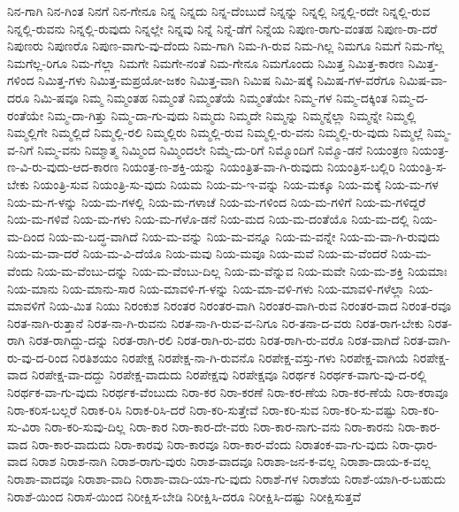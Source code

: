 {ನಿನ-ಗಾಗಿ
ನಿನ-ಗಿಂತ
ನಿನಗೆ
ನಿನ-ಗೇನೂ
ನಿನ್ನ
ನಿನ್ನದು
ನಿನ್ನ-ದೆಂಬುದೆ
ನಿನ್ನನ್ನು
ನಿನ್ನಲ್ಲಿ
ನಿನ್ನಲ್ಲಿ-ರದೇ
ನಿನ್ನಲ್ಲಿ-ರುವ
ನಿನ್ನಲ್ಲಿ-ರುವನು
ನಿನ್ನಲ್ಲಿ-ರುವುದು
ನಿನ್ನಲ್ಲೇ
ನಿನ್ನವು
ನಿನ್ನೆ
ನಿನ್ನೆ-ಡೆಗೆ
ನಿನ್ನೆಯ
ನಿಪುಣ-ರಾಗು-ವಂತಹ
ನಿಪುಣ-ರಾ-ದರೆ
ನಿಪುಣರು
ನಿಪುಣರೊ
ನಿಪುಣ-ವಾಗು-ವು-ದೆಂದು
ನಿಮ-ಗಾಗಿ
ನಿಮ-ಗಿ-ರುವ
ನಿಮ-ಗಿಲ್ಲ
ನಿಮಗೂ
ನಿಮಗೆ
ನಿಮ-ಗೆಲ್ಲ
ನಿಮಗೆಲ್ಲ-ರಿಗೂ
ನಿಮ-ಗೆಲ್ಲಾ
ನಿಮಗೇ
ನಿಮಗೇ-ನಂತೆ
ನಿಮ-ಗೇನೂ
ನಿಮಗೊಂದು
ನಿಮಿತ್ತ
ನಿಮಿತ್ತ-ಕಾರಣ
ನಿಮಿತ್ತ-ಗಳಿಂದ
ನಿಮಿತ್ತ-ಗಳು
ನಿಮಿತ್ತ-ಮಪ್ರಯೋ-ಜಕಂ
ನಿಮಿತ್ತ-ವಾಗಿ
ನಿಮಿಷ
ನಿಮಿ-ಷಕ್ಕೆ
ನಿಮಿಷ-ಗಳ-ವರೆಗೂ
ನಿಮಿಷ-ವಾ-ದರೂ
ನಿಮಿ-ಷವೂ
ನಿಮ್ಮ
ನಿಮ್ಮಂತಹ
ನಿಮ್ಮಂತೆ
ನಿಮ್ಮಂತೆಯೆ
ನಿಮ್ಮಂತೆಯೇ
ನಿಮ್ಮ-ಗಳ
ನಿಮ್ಮ-ದಕ್ಕಿಂತ
ನಿಮ್ಮ-ದ-ರಂತೆಯೇ
ನಿಮ್ಮ-ದಾ-ಗಿತ್ತು
ನಿಮ್ಮ-ದಾ-ಗು-ವುದು
ನಿಮ್ಮದು
ನಿಮ್ಮದೇ
ನಿಮ್ಮನ್ನು
ನಿಮ್ಮನ್ನೆಲ್ಲಾ
ನಿಮ್ಮನ್ನೇ
ನಿಮ್ಮಲ್ಲಿ
ನಿಮ್ಮಲ್ಲಿಗೇ
ನಿಮ್ಮಲ್ಲಿದೆ
ನಿಮ್ಮಲ್ಲಿ-ರಲಿ
ನಿಮ್ಮಲ್ಲಿರು
ನಿಮ್ಮಲ್ಲಿ-ರುವ
ನಿಮ್ಮಲ್ಲಿ-ರು-ವನು
ನಿಮ್ಮಲ್ಲಿ-ರು-ವುದು
ನಿಮ್ಮಲ್ಲೆ
ನಿಮ್ಮ-ವ-ನಿಗೆ
ನಿಮ್ಮ-ವನು
ನಿಮ್ಮಾತ್ಮ
ನಿಮ್ಮಿಂದ
ನಿಮ್ಮಿಂದಲೇ
ನಿಮ್ಮೆ-ದು-ರಿಗೆ
ನಿಮ್ಮೊಂದಿಗೆ
ನಿಮ್ಮೊ-ಡನೆ
ನಿಯಂತ್ರಣ
ನಿಯಂತ್ರ-ಣ-ವಿ-ರು-ವುದು-ಆದ-ಕಾರಣ
ನಿಯಂತ್ರ-ಣ-ಶಕ್ತಿ-ಯನ್ನು
ನಿಯಂತ್ರಿತ-ವಾ-ಗಿ-ರುವುದು
ನಿಯಂತ್ರಿಸ-ಬಲ್ಲಿರಿ
ನಿಯಂತ್ರಿ-ಸ-ಬೇಕು
ನಿಯಂತ್ರಿ-ಸುವ
ನಿಯಂತ್ರಿ-ಸು-ವುದು
ನಿಯಮ
ನಿಯ-ಮ-ಇ-ವನ್ನು
ನಿಯ-ಮಕ್ಕೂ
ನಿಯ-ಮಕ್ಕೆ
ನಿಯ-ಮ-ಗಳ
ನಿಯ-ಮ-ಗ-ಳನ್ನು
ನಿಯ-ಮ-ಗಳಲ್ಲಿ
ನಿಯ-ಮ-ಗಳಾಚೆ
ನಿಯ-ಮ-ಗಳಿಂದ
ನಿಯ-ಮ-ಗಳಿಗೆ
ನಿಯ-ಮ-ಗಳಿದ್ದರೆ
ನಿಯ-ಮ-ಗಳಿವೆ
ನಿಯ-ಮ-ಗಳು
ನಿಯ-ಮ-ಗಳೊ-ಡನೆ
ನಿಯ-ಮದ
ನಿಯ-ಮ-ದಂತೆಯೊ
ನಿಯ-ಮ-ದಲ್ಲಿ
ನಿಯ-ಮ-ದಿಂದ
ನಿಯ-ಮ-ಬದ್ಧ-ವಾಗಿದೆ
ನಿಯ-ಮ-ವನ್ನು
ನಿಯ-ಮ-ವನ್ನೂ
ನಿಯ-ಮ-ವನ್ನೇ
ನಿಯ-ಮ-ವಾ-ಗಿ-ರುವುದು
ನಿಯ-ಮ-ವಾ-ದರೆ
ನಿಯ-ಮ-ವಿ-ದೆಯೊ
ನಿಯ-ಮವು
ನಿಯ-ಮವೂ
ನಿಯ-ಮವೆ
ನಿಯ-ಮ-ವೆಂದರೆ
ನಿಯ-ಮ-ವೆಂದು
ನಿಯ-ಮ-ವೆಂಬು-ದನ್ನು
ನಿಯ-ಮ-ವೆಂಬು-ದಿಲ್ಲ
ನಿಯ-ಮ-ವೆನ್ನುವ
ನಿಯ-ಮವೇ
ನಿಯ-ಮ-ಶಕ್ತಿ
ನಿಯಮಾಃ
ನಿಯ-ಮಾನು
ನಿಯ-ಮಾನು-ಸಾರ
ನಿಯ-ಮಾವಳಿ-ಗ-ಳನ್ನು
ನಿಯ-ಮಾ-ವಳಿ-ಗಳು
ನಿಯ-ಮಾವಳಿ-ಗಳೆಲ್ಲಾ
ನಿಯ-ಮಾವಳಿಗೆ
ನಿಯ-ಮಿತ
ನಿಯು
ನಿರಂಕುಶ
ನಿರಂತರ
ನಿರಂತರ-ವಾಗಿ
ನಿರಂತರ-ವಾಗಿ-ರುವ
ನಿರಂತರ-ವಾದ
ನಿರಂತ-ರವೂ
ನಿರತ-ನಾಗಿ-ರುತ್ತಾನೆ
ನಿರತ-ನಾ-ಗಿ-ರುವನು
ನಿರತ-ನಾ-ಗಿ-ರುವ-ವ-ನಿಗೂ
ನಿರ-ತನಾ-ದ-ವರು
ನಿರತ-ರಾಗ-ಬೇಕು
ನಿರತ-ರಾಗಿ
ನಿರತ-ರಾಗಿದ್ದು-ದನ್ನು
ನಿರತ-ರಾಗಿ-ರಲಿ
ನಿರತ-ರಾಗಿ-ರು-ವರು
ನಿರತ-ರಾಗಿ-ರು-ವರೊ
ನಿರತ-ವಾಗಿದೆ
ನಿರತ-ವಾಗಿ-ರು-ವು-ದ-ರಿಂದ
ನಿರತಿಶಯಂ
ನಿರಪೇಕ್ಷ
ನಿರಪೇಕ್ಷ-ನಾ-ಗಿ-ರುವನೊ
ನಿರಪೇಕ್ಷ-ವಸ್ತು-ಗಳು
ನಿರಪೇಕ್ಷ-ವಾಗಿಯೆ
ನಿರಪೇಕ್ಷ-ವಾದ
ನಿರಪೇಕ್ಷ-ವಾ-ದದ್ದು
ನಿರಪೇಕ್ಷ-ವಾದುದು
ನಿರಪೇಕ್ಷವು
ನಿರಪೇಕ್ಷವೂ
ನಿರರ್ಥಕ
ನಿರರ್ಥಕ-ವಾಗು-ವು-ದ-ರಲ್ಲಿ
ನಿರರ್ಥಕ-ವಾ-ಗು-ವುದು
ನಿರರ್ಥಕ-ವೆಂಬುದು
ನಿರಾ-ಕರ
ನಿರಾ-ಕರಣೆ
ನಿರಾ-ಕರ-ಣೆಯ
ನಿರಾ-ಕರ-ಣೆಯೆ
ನಿರಾ-ಕರಾವೂ
ನಿರಾ-ಕರಿಸ-ಬಲ್ಲರೆ
ನಿರಾಕ-ರಿಸಿ
ನಿರಾಕ-ರಿಸಿ-ದರೆ
ನಿರಾ-ಕರಿ-ಸುತ್ತೇವೆ
ನಿರಾ-ಕರಿ-ಸುವ
ನಿರಾ-ಕರಿ-ಸು-ವಷ್ಟು
ನಿರಾ-ಕರಿ-ಸು-ವಿರಾ
ನಿರಾ-ಕರಿ-ಸುವು-ದಿಲ್ಲ
ನಿರಾ-ಕಾರ
ನಿರಾ-ಕಾರ-ದೇ-ವರು
ನಿರಾ-ಕಾರ-ನಾಗು-ವನು
ನಿರಾ-ಕಾರನು
ನಿರಾ-ಕಾರ-ವಾದ
ನಿರಾ-ಕಾರ-ವಾದುದು
ನಿರಾ-ಕಾರವು
ನಿರಾ-ಕಾರವೂ
ನಿರಾ-ಕಾರ-ವೆಂದು
ನಿರಾತಂಕ-ವಾ-ಗು-ವುದು
ನಿರಾ-ಧಾರ-ವಾದ
ನಿರಾಶ
ನಿರಾಶ-ನಾಗಿ
ನಿರಾಶ-ರಾಗು-ವುರು
ನಿರಾಶ-ವಾದವೂ
ನಿರಾಶಾ-ಜನ-ಕ-ವಲ್ಲ
ನಿರಾಶಾ-ದಾಯ-ಕ-ವಲ್ಲ
ನಿರಾಶಾ-ವಾದವೂ
ನಿರಾಶಾ-ವಾದಿ
ನಿರಾಶಾ-ವಾದಿ-ಯಾ-ಗು-ವುದು
ನಿರಾಶೆ-ಗಳ
ನಿರಾಶೆಯ
ನಿರಾಶೆ-ಯಾಗಿ-ರ-ಬಹುದು
ನಿರಾಶೆ-ಯಿಂದ
ನಿರಾಸೆ-ಯಿಂದ
ನಿರೀಕ್ಷಿಸ-ಬೇಡಿ
ನಿರೀಕ್ಷಿಸಿ-ದರೂ
ನಿರೀಕ್ಷಿಸಿ-ದಷ್ಟು
ನಿರೀಕ್ಷಿಸುತ್ತವೆ
}
